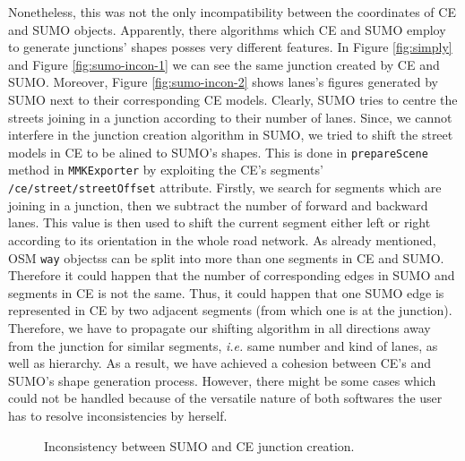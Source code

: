 Nonetheless, this was not the only incompatibility between the coordinates of CE and SUMO objects. Apparently, there algorithms which CE and SUMO employ to generate junctions' shapes posses very different features. In Figure \ref{fig:simply} and Figure \ref{fig:sumo-incon-1} we can see the same junction created by CE and SUMO. Moreover, Figure \ref{fig:sumo-incon-2} shows lanes's figures generated by SUMO next to their corresponding CE models. Clearly, SUMO tries to centre the streets joining in a junction according to their number of lanes. Since, we cannot interfere in the junction creation algorithm in SUMO, we tried to shift the street models in CE to be alined to SUMO's shapes. This is done in \texttt{prepareScene} method in \texttt{MMKExporter} by exploiting the CE's segments' \texttt{/ce/street/streetOffset} attribute. Firstly, we search for segments which are joining in a junction, then we subtract the number of forward and backward lanes. This value is then used to shift the current segment either left or right according to its orientation in the whole road network. As already mentioned, OSM \texttt{way} objectss can be split into more than one segments in CE and SUMO. Therefore it could happen that the number of corresponding edges in SUMO and segments in CE is not the same. Thus, it could happen that one SUMO edge is represented in CE by two adjacent segments (from which one is at the junction). Therefore, we have to propagate our shifting algorithm in all directions away from the junction for similar segments, \emph{i.e.} same number and kind of lanes, as well as hierarchy. As a result, we have achieved a cohesion between CE's and SUMO's shape generation process. However, there might be some cases which could not be handled because of the versatile nature of both softwares the user has to resolve inconsistencies by herself.\\

\begin{figure}[htb]
	\centering
	\caption{Inconsistency between SUMO and CE junction creation.}
\end{figure}

